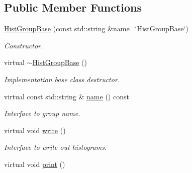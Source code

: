 \subsection*{Public Member Functions}
\begin{CompactItemize}
\item 
\hyperlink{classHistGroupBase_7dcfcab8b9ec8a23632726d95600f21a}{Hist\-Group\-Base} (const std::string \&name=\char`\"{}Hist\-Group\-Base\char`\"{})
\begin{CompactList}\small\item\em Constructor. \item\end{CompactList}\item 
\hypertarget{classHistGroupBase_65f28186fc63f68125ba3230a019ff2a}{
virtual \hyperlink{classHistGroupBase_65f28186fc63f68125ba3230a019ff2a}{$\sim$Hist\-Group\-Base} ()}
\label{classHistGroupBase_65f28186fc63f68125ba3230a019ff2a}

\begin{CompactList}\small\item\em Implementation base class destructor. \item\end{CompactList}\item 
\hypertarget{classHistGroupBase_ca0a54404e5164dd15dbe016338b9ccf}{
virtual const std::string \& \hyperlink{classHistGroupBase_ca0a54404e5164dd15dbe016338b9ccf}{name} () const }
\label{classHistGroupBase_ca0a54404e5164dd15dbe016338b9ccf}

\begin{CompactList}\small\item\em Interface to group name. \item\end{CompactList}\item 
\hypertarget{classHistGroupBase_0b82f8b5aae04ce1678e038bb792c146}{
virtual void \hyperlink{classHistGroupBase_0b82f8b5aae04ce1678e038bb792c146}{write} ()}
\label{classHistGroupBase_0b82f8b5aae04ce1678e038bb792c146}

\begin{CompactList}\small\item\em Interface to write out histograms. \item\end{CompactList}\item 
\hypertarget{classHistGroupBase_e6df346a1c2fc4225c2eb2dd620d200d}{
virtual void \hyperlink{classHistGroupBase_e6df346a1c2fc4225c2eb2dd620d200d}{print} ()}
\label{classHistGroupBase_e6df346a1c2fc4225c2eb2dd620d200d}


\end{CompactItemize}
